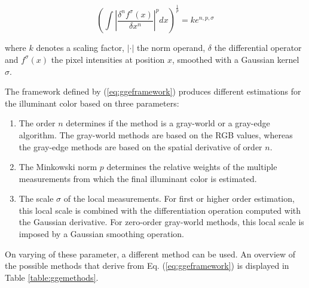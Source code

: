 \begin{equation}\label{eq:ggeframework}
\left( \int 	\left | \frac{\delta^n f^{\sigma}(x)}{\delta x^{n}} \right |^{p} dx \right)^{\frac{1}{p}} = k e ^{n, p, \sigma}
\end{equation}

where $k$ denotes a scaling factor, $|\cdot|$ the norm operand, $\delta$ the differential operator and $f^{\sigma}(x)$ the pixel intensities at position $x$, smoothed with a Gaussian kernel $\sigma$.

The framework defined by (\ref{eq:ggeframework}) produces different estimations for the illuminant color based on three parameters:

\begin{enumerate}
\item The order $n$ determines if the method is a gray-world or a gray-edge algorithm. The gray-world methods are based on the RGB values, whereas the gray-edge methods are based on the spatial derivative of order $n$.
\item The Minkowski norm $p$ determines the relative weights of the multiple measurements from which the final illuminant color is estimated.
\item The scale $\sigma$ of the local measurements. For first or higher order estimation, this local scale is combined with the differentiation operation computed with the Gaussian derivative. For zero-order gray-world methods, this local scale is imposed by a Gaussian smoothing operation.
\end{enumerate}

On varying of these parameter, a different method can be used. An overview of the possible methods that derive from  Eq. (\ref{eq:ggeframework}) is displayed in Table \ref{table:ggemethods}.

